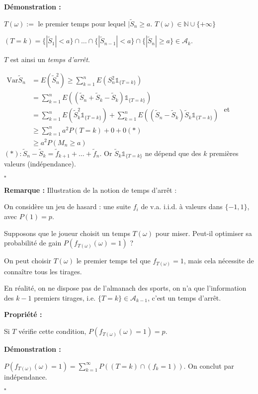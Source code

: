 \documentclass[10pt,a4paper,notitlepage ]{report}
\newcommand{\N}{\mathbb N}
\newcommand{\A}{\mathcal A}
\newcommand{\var}{\mathrm{Var}}
\newcounter{th}
\newenvironment{propriete}[1][]{
	\begin{tcolorbox}
		\textbf{Propriété #1 : }
}
{\end{tcolorbox}}
\newenvironment{demo}[1][]{

	\textbf{Démonstration #1 :}
}{\begin{flushright}
	$\square$
\end{flushright}
}
\newenvironment{rem}{
	
	\textbf{Remarque :}}{}
\begin{document}
\begin{demo}
	$T(\omega) :=$ le premier temps pour lequel $|\tilde S_n \ge a$. $T(\omega) \in \N \cup \{+\infty\}$
	
	$(T = k) = \{|\tilde S_1| < a \} \cap \dots \cap \{|\tilde S_{n-1}| < a \} \cap \{|\tilde S_n| \ge a \} \in \A_k$.
	
	$T$ est ainsi un \emph{temps d'arrêt}.
	
	$\begin{aligned}
		\var \tilde S_n &= E(\tilde S_n^2) \ge \sum_{k=1}^n E(S_n^2 \mathds 1_{\{T=k\}}) \\
		&= \sum_{k=1}^n E((\tilde S_n + \tilde S_k - \tilde S_k) \mathds 1_{\{T=k\}}) \\
		&= \sum_{k=1}^n E(\tilde S_k^2 \mathds 1_{\{T=k\}}) + \sum_{k=1}^n E((\tilde S_n - \tilde S_k)\tilde S_k \mathds 1_{\{T=k\}}) \\
		&\ge \sum_{k=1}^n a^2P(T=k) + 0 + 0 (*) \\
		&\ge a^2 P(M_n \ge a)
	\end{aligned}$
et $(*) : \tilde S_n - \tilde S_k = \tilde f_{k+1} + \dots + \tilde f_n$. Or $\tilde S_k \mathds 1_{\{T=k\}}$ ne dépend que des $k$ premières valeurs (indépendance).
\end{demo}

\begin{rem}
	Illustration de la notion de temps d'arrêt :
	
	On considère un jeu de hasard : une suite $f_i$ de v.a. i.i.d. à valeurs dans $\{-1, 1\}$, avec $P(1) =p$.
	
	Supposons que le joueur choisit un temps $T(\omega)$ pour miser. Peut-il optimiser sa probabilité de gain $P(f_{T(\omega)}(\omega) = 1)$ ?
	
	On peut choisir $T(\omega)$ le premier temps tel que $f_{T(\omega)} = 1$, mais cela nécessite de connaître tous les tirages.
	
	En réalité, on ne dispose pas de l'almanach des sports, on n'a que l'information des $k-1$ premiers tirages, i.e. $\{T=k\} \in \A_{k-1}$, c'est un temps d'arrêt.
	
	\begin{propriete}
		Si $T$ vérifie cette condition, $P(f_{T(\omega)}(\omega)=1) = p$.
	\end{propriete}
	\begin{demo}
		$P(f_{T(\omega)}(\omega)=1) = \sum_{k=1}^\infty P((T=k) \cap (f_k =1))$. On conclut par indépendance.
	\end{demo}
\end{rem}
\end{document}
